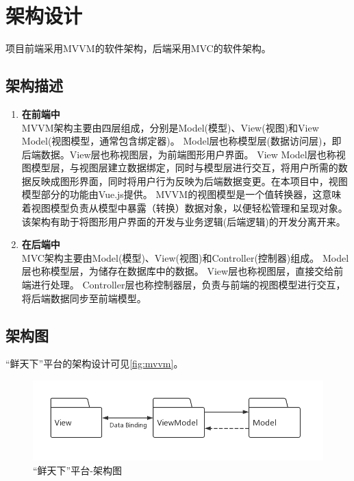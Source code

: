 \chapter{架构设计}

项目前端采用MVVM的软件架构，后端采用MVC的软件架构。

\section{架构描述}

\begin{enumerate}
    \item \textbf{在前端中} \\
    MVVM架构主要由四层组成，分别是Model(模型)、View(视图)和View Model(视图模型，通常包含绑定器)。
    Model层也称模型层(数据访问层)，即后端数据。View层也称视图层，为前端图形用户界面。
    View Model层也称视图模型层，与视图层建立数据绑定，同时与模型层进行交互，将用户所需的数据反映成图形界面，同时将用户行为反映为后端数据变更。在本项目中，视图模型部分的功能由Vue.js提供。
    MVVM的视图模型是一个值转换器，这意味着视图模型负责从模型中暴露（转换）数据对象，以便轻松管理和呈现对象。\\
    该架构有助于将图形用户界面的开发与业务逻辑(后端逻辑)的开发分离开来。
    \item \textbf{在后端中} \\
    MVC架构主要由Model(模型)、View(视图)和Controller(控制器)组成。
    Model层也称模型层，为储存在数据库中的数据。
    View层也称视图层，直接交给前端进行处理。
    Controller层也称控制器层，负责与前端的视图模型进行交互，将后端数据同步至前端模型。
\end{enumerate}



\section{架构图}

“鲜天下”平台的架构设计可见\autoref{fig:mvvm}。

\begin{figure}[htp]
    \centering
    \includegraphics[width=15cm]{figure/mvvm.jpg}
    \caption{“鲜天下”平台-架构图}
    \label{fig:mvvm}
\end{figure}


